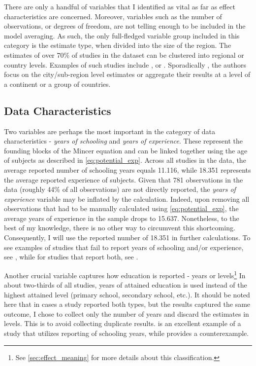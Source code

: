 There are only a handful of variables that I identified as vital as far as effect characteristics are concerned. Moreover, variables such as the number of observations, or degrees of freedom, are not telling enough to be included in the model averaging. As such, the only full-fledged variable group included in this category is the estimate type, when divided into the size of the region. The estimates of over 70\% of studies in the dataset can be clustered into regional or country levels. Examples of such studies include \cite{walker2008college, fang2012returns}, or \cite{angrist1991compulsory}. Sporadically \citep{krafft2019what, chanis2021tell}, the authors focus on the city/sub-region level estimates or aggregate their results at a level of a continent or a group of countries.

\subsection{Data Characteristics}
\label{subsec:data_char}

Two variables are perhaps the most important in the category of data characteristics - \textit{years of schooling} and \textit{years of experience}. These represent the founding blocks of the Mincer equation and can be linked together using the age of subjects as described in \autoref{eq:potential_exp}. Across all studies in the data, the average reported number of schooling years equals 11.116, while 18.351 represents the average reported experience of subjects. Given that 781 observations in the data (roughly 44\% of all observations) are not directly reported, the \textit{years of experience} variable may be inflated by the calculation. Indeed, upon removing all observations that had to be manually calculated using \autoref{eq:potential_exp}, the average years of experience in the sample drops to 15.637. Nonetheless, to the best of my knowledge, there is no other way to circumvent this shortcoming. Consequently, I will use the reported number of 18.351 in further calculations. To see examples of studies that fail to report years of schooling and/or experience, see \cite{pischke2005zero, psacharopoulos1982earnings}, while for studies that report both, see \cite{belzil2002unobserved, girma2005heterogeneity}.

Another crucial variable captures how education is reported - years or levels\footnote{See \autoref{sec:effect_meaning} for more details about this classification.} In about two-thirds of all studies, years of attained education is used instead of the highest attained level (primary school, secondary school, etc.). It should be noted here that in cases a study reported both types, but the results captured the same outcome, I chose to collect only the number of years and discard the estimates in levels. This is to avoid collecting duplicate results. \cite{harmon2002returns} is an excellent example of a study that utilizes reporting of schooling years, while \cite{duraisamy2002changes} provides a counterexample.

